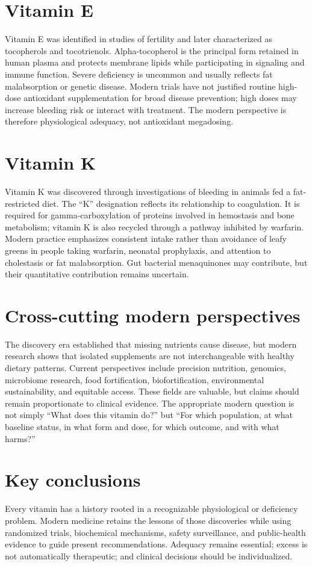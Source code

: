 \section{Vitamin E}
Vitamin E was identified in studies of fertility and later characterized as tocopherols and tocotrienols. Alpha-tocopherol is the principal form retained in human plasma and protects membrane lipids while participating in signaling and immune function. Severe deficiency is uncommon and usually reflects fat malabsorption or genetic disease. Modern trials have not justified routine high-dose antioxidant supplementation for broad disease prevention; high doses may increase bleeding risk or interact with treatment. The modern perspective is therefore physiological adequacy, not antioxidant megadosing. \cite{historyNutrition,odsE,uspstfSupplements}

\section{Vitamin K}
Vitamin K was discovered through investigations of bleeding in animals fed a fat-restricted diet. The ``K'' designation reflects its relationship to coagulation. It is required for gamma-carboxylation of proteins involved in hemostasis and bone metabolism; vitamin K is also recycled through a pathway inhibited by warfarin. Modern practice emphasizes consistent intake rather than avoidance of leafy greens in people taking warfarin, neonatal prophylaxis, and attention to cholestasis or fat malabsorption. Gut bacterial menaquinones may contribute, but their quantitative contribution remains uncertain. \cite{historyNutrition,odsK}

\section{Cross-cutting modern perspectives}
The discovery era established that missing nutrients cause disease, but modern research shows that isolated supplements are not interchangeable with healthy dietary patterns. Current perspectives include precision nutrition, genomics, microbiome research, food fortification, biofortification, environmental sustainability, and equitable access. These fields are valuable, but claims should remain proportionate to clinical evidence. The appropriate modern question is not simply ``What does this vitamin do?'' but ``For which population, at what baseline status, in what form and dose, for which outcome, and with what harms?'' \cite{historyNutrition,uspstfSupplements}

\section{Key conclusions}
Every vitamin has a history rooted in a recognizable physiological or deficiency problem. Modern medicine retains the lessons of those discoveries while using randomized trials, biochemical mechanisms, safety surveillance, and public-health evidence to guide present recommendations. Adequacy remains essential; excess is not automatically therapeutic; and clinical decisions should be individualized. \cite{historyNutrition,uspstfSupplements}
